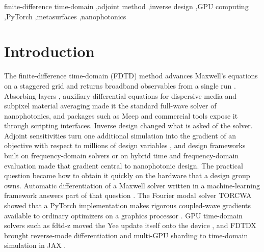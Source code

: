 \documentclass[preprint,11pt]{elsarticle}
\begin{document}
\begin{frontmatter}
\begin{keyword}
finite-difference time-domain \sep adjoint method \sep inverse design \sep GPU computing \sep PyTorch \sep metasurfaces \sep nanophotonics
\end{keyword}

\end{frontmatter}

\linenumbers

\section{Introduction}

The finite-difference time-domain (FDTD) method advances Maxwell's equations on a staggered grid and returns broadband observables from a single run \citep{yee1966,taflove2005}. Absorbing layers \citep{berenger1994,roden2000}, auxiliary differential equations for dispersive media \citep{okoniewski1997} and subpixel material averaging \citep{farjadpour2006} made it the standard full-wave solver of nanophotonics, and packages such as Meep \citep{oskooi2010} and commercial tools \citep{lumerical,tidy3d} expose it through scripting interfaces. Inverse design changed what is asked of the solver. Adjoint sensitivities turn one additional simulation into the gradient of an objective with respect to millions of design variables \citep{georgieva2002,jensen2011,elesin2012,piggott2015,molesky2018,hughes2018,christiansen2021}, and design frameworks built on frequency-domain solvers \citep{su2020,minkov2020} or on hybrid time and frequency-domain evaluation \citep{hammond2022} made that gradient central to nanophotonic design. The practical question became how to obtain it quickly on the hardware that a design group owns. Automatic differentiation of a Maxwell solver written in a machine-learning framework answers part of that question \citep{hughes2019}. The Fourier modal solver TORCWA showed that a PyTorch implementation makes rigorous coupled-wave gradients available to ordinary optimizers on a graphics processor \citep{kim2023}. GPU time-domain solvers such as fdtd-z moved the Yee update itself onto the device \citep{fdtdz}, and FDTDX brought reverse-mode differentiation and multi-GPU sharding to time-domain simulation in JAX \citep{mahlau2024}.
\end{document}
